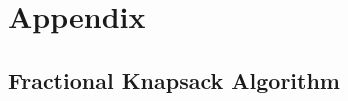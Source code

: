 \documentclass[letterpaper, 10pt,DIV=13]{scrartcl}
\numberwithin{equation}{section} %
\numberwithin{figure}{section} %
\numberwithin{table}{section} %
\begin{document}
\section{Appendix}
\subsection{Fractional Knapsack Algorithm}

\end{document}
